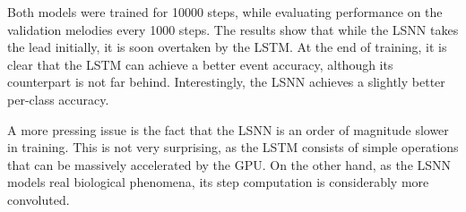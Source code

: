\documentclass[../../report.tex]{subfiles}
\begin{document}
Both models were trained for \num{10000} steps, while evaluating performance on
the validation melodies every \num{1000} steps. The results show that while the
LSNN takes the lead initially, it is soon overtaken by the LSTM. At the end of
training, it is clear that the LSTM can achieve a better event accuracy,
although its counterpart is not far behind. Interestingly, the LSNN achieves a
slightly better per-class accuracy.

A more pressing issue is the fact that the LSNN is an order of magnitude slower
in training. This is not very surprising, as the LSTM consists of simple
operations that can be massively accelerated by the GPU. On the other hand, as
the LSNN models real biological phenomena, its step computation is considerably
more convoluted.

\end{document}

